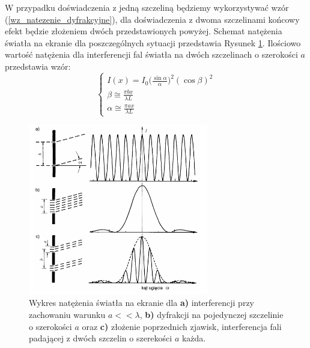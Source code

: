 \documentclass{article}
\begin{document}
W przypadku doświadczenia z jedną szczeliną będziemy wykorzystywać wzór (\ref{wz_natezenie_dyfrakcyjne}), dla doświadczenia z dwoma szczelinami końcowy efekt będzie złożeniem dwóch przedstawionych powyżej. Schemat natężenia światła na ekranie dla poszczególnych sytuacji przedstawia Rysunek \ref{rysunki_prazkow}. Ilościowo wartość natężenia dla interferencji fal światła na dwóch szczelinach o szerokości $a$ przedstawia wzór:
\begin{equation}
\begin{cases}
I(x) = I_0\Big(\frac{\sin \alpha}{\alpha}\Big)^2(\cos \beta)^2   \\
\beta \cong \frac{\pi b x}{\lambda L}\\
\alpha \cong \frac{\pi a x}{\lambda L}
\end{cases}
\end{equation}
\begin{figure}[h!]
	\centering
	\includegraphics[width=0.7\textwidth]{images/prazki.png}
	\caption{Wykres natężenia światła na ekranie dla \textbf{a)} interferencji przy zachowaniu warunku $a<<\lambda$, \textbf{b)} dyfrakcji na pojedynczej szczelinie o szerokości $a$ oraz \textbf{c)} złożenie poprzednich zjawisk, interferencja fali padającej z dwóch szczelin o szerekości $a$ każda.\cite{1}}
	\label{rysunki_prazkow}
\end{figure}
\end{document}
